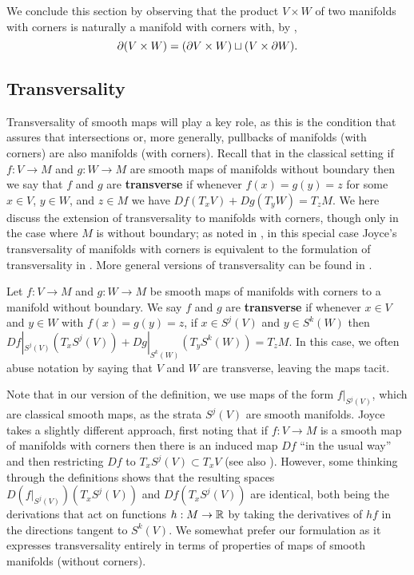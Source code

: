 We conclude this section by observing that the product $V \times W$ of two manifolds with corners is naturally a manifold with corners with, by \cite[Proposition 2.12]{Joy12},
$$\partial (V \times W) = (\partial V \times W) \sqcup (V \times \partial W).$$

\subsection{Transversality}

Transversality of smooth maps will play a key role, as this is the condition that assures that intersections or, more generally, pullbacks of manifolds (with corners) are also manifolds (with corners).
Recall that in the classical setting if $f \colon V \to M$ and $g \colon W \to M$ are smooth maps of manifolds without boundary then we say that $f$ and $g$ are \textbf{transverse} if whenever $f(x) = g(y) = z$ for some $x \in V$, $y \in W$, and $z \in M$ we have $Df(T_xV)+Dg(T_yW) = T_z M$.
We here discuss the extension of transversality to manifolds with corners, though only in the case where $M$ is without boundary; as noted in \cite[Remark 6.3]{Joy12}, in this special case Joyce's transversality of manifolds with corners is equivalent to the formulation of transversality in \cite[Section 7.2]{MaDo92}.
More general versions of transversality can be found in \cite[Section 6]{Joy12}.

\begin{definition}{\cite[Special case of Definition 6.1]{Joy12}}
	Let $f \colon V \to M$ and $g \colon W \to M$ be smooth maps of manifolds with corners to a manifold without boundary.
	We say $f$ and $g$ are \textbf{transverse} if whenever $x \in V$ and $y\in W$ with $f(x) = g(y) = z$, if  $x\in S^j(V)$ and $y \in S^k(W)$  then $Df|_{S^j(V)}(T_xS^j(V))+Dg|_{S^k(W)}(T_yS^k(W)) = T_zM$.
	In this case, we often abuse notation by saying that $V$ and $W$ are transverse, leaving the maps tacit.
\end{definition}

Note that in our version of the definition, we use maps of the form $f|_{S^j(V)}$, which are classical smooth maps, as the strata $S^j(V)$ are smooth manifolds. Joyce takes a slightly different approach, first noting that if $f:V\to M$ is a smooth map of manifolds with corners then there is an induced map $Df$ ``in the usual way'' \cite[Definition 3.2]{Joy12} and then restricting $Df$ to $T_xS^j(V)\subset T_xV$ (see also \cite[Proposition 2.4]{Joy12}). However, some thinking through the definitions shows that the resulting spaces $D(f|_{S^j(V)})(T_xS^j(V))$ and $Df(T_xS^j(V))$ are identical, both being the derivations that act on functions $h:M\to \mathbb{R}$ by taking the derivatives of $hf$ in the directions tangent to $S^k(V)$. We somewhat prefer our formulation as it expresses transversality entirely in terms of properties of maps of smooth manifolds (without corners).

